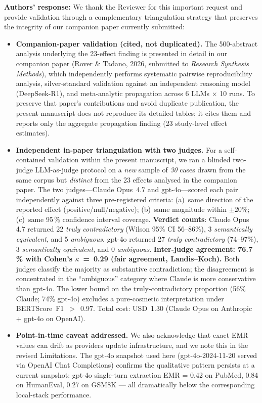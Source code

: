 \documentclass[11pt,a4paper]{article}
\newcommand{\response}[1]{\par\noindent\textbf{\color{revgreen}Authors' response:} #1\par}
\begin{document}
\response{We thank the Reviewer for this important request and provide validation through a complementary triangulation strategy that preserves the integrity of our companion paper currently submitted:

\begin{itemize}[leftmargin=*]
  \item \textbf{Companion-paper validation (cited, not duplicated).} The 500-abstract analysis underlying the 23-effect finding is presented in detail in our companion paper (Rover \& Tadano, 2026, submitted to \emph{Research Synthesis Methods}), which independently performs systematic pairwise reproducibility analysis, silver-standard validation against an independent reasoning model (DeepSeek-R1), and meta-analytic propagation across 6 LLMs $\times$ 10 runs. To preserve that paper's contributions and avoid duplicate publication, the present manuscript does not reproduce its detailed tables; it cites them and reports only the aggregate propagation finding (23 study-level effect estimates).
  \item \textbf{Independent in-paper triangulation with two judges.} For a self-contained validation within the present manuscript, we ran a blinded two-judge LLM-as-judge protocol on a \emph{new} sample of \emph{30} cases drawn from the same corpus but \emph{distinct} from the 23 effects analysed in the companion paper. The two judges---Claude Opus~4.7 and gpt-4o---scored each pair independently against three pre-registered criteria: (a)~same direction of the reported effect (positive/null/negative); (b)~same magnitude within $\pm 20\%$; (c)~same 95\,\% confidence interval coverage. \textbf{Verdict counts}: Claude Opus 4.7 returned 22 \emph{truly contradictory} (Wilson 95\% CI 56--86\%), 3 \emph{semantically equivalent}, and 5 \emph{ambiguous}. gpt-4o returned 27 \emph{truly contradictory} (74--97\%), 3 \emph{semantically equivalent}, and 0 \emph{ambiguous}. \textbf{Inter-judge agreement: 76.7\,\% with Cohen's $\kappa$~=~0.29 (fair agreement, Landis--Koch).} Both judges classify the majority as substantive contradiction; the disagreement is concentrated in the ``ambiguous'' category where Claude is more conservative than gpt-4o. The lower bound on the truly-contradictory proportion (56\% Claude; 74\% gpt-4o) excludes a pure-cosmetic interpretation under BERTScore~F1~$>$~0.97. Total cost: USD~1.30 (Claude Opus on Anthropic + gpt-4o on OpenAI).
  \item \textbf{Point-in-time caveat addressed.} We also acknowledge that exact EMR values can drift as providers update infrastructure, and we note this in the revised Limitations. The gpt-4o snapshot used here (gpt-4o-2024-11-20 served via OpenAI Chat Completions) confirms the qualitative pattern persists at a current snapshot: gpt-4o single-turn extraction EMR = 0.42 on PubMed, 0.84 on HumanEval, 0.27 on GSM8K --- all dramatically below the corresponding local-stack performance.
\end{itemize}

}
\end{document}

